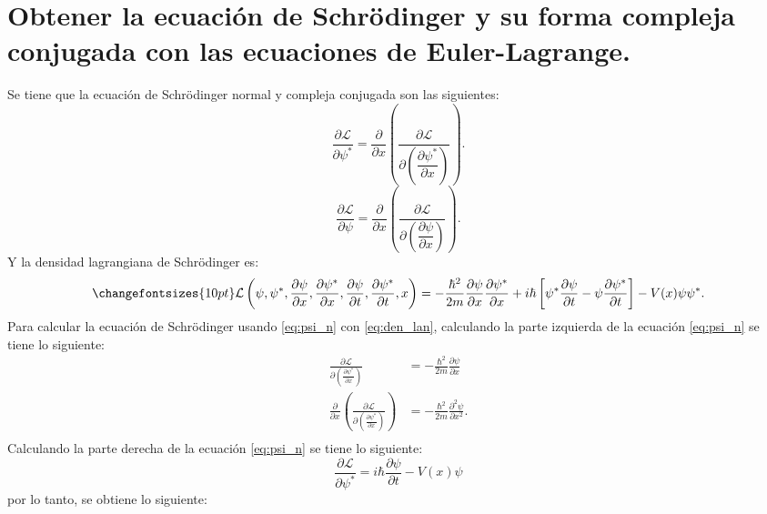 \section{Obtener la ecuación de Schr\"odinger y su forma compleja conjugada con las ecuaciones de Euler-Lagrange.}
Se tiene que la ecuación de Schr\"odinger normal y compleja conjugada son las siguientes:
\begin{equation}
    \frac{\partial \mathcal{L}}{\partial \psi^*}= \frac{\partial}{\partial x} \left(\frac{\partial \mathcal{L}}{\partial\left(\dfrac{\partial \psi^*}{\partial x}\right)} \right).
    \label{eq:psi_n}
\end{equation}
\begin{equation}
    \frac{\partial \mathcal{L}}{\partial \psi}= \frac{\partial}{\partial x} \left(\frac{\partial \mathcal{L}}{\partial\left(\dfrac{\partial \psi}{\partial x}\right)} \right).
    \label{eq:psi_con}
\end{equation}
Y la densidad lagrangiana de Schr\"odinger es:
\begin{equation}
    \changefontsizes{10pt}
    \mathcal{L}\left(\psi,\psi^*,\frac{\partial \psi}{\partial x},\frac{\partial \psi^*}{\partial x},\frac{\partial \psi}{\partial t},\frac{\partial \psi^*}{\partial t},x\right) = -\frac{\hbar^2}{2m} \frac{\partial \psi}{\partial x} \frac{\partial \psi^*}{\partial x}+i\hbar \left[ \psi^* \frac{\partial \psi}{\partial t} - \psi \frac{\partial \psi^*}{\partial t} \right] -V(x)\psi \psi^*.
    \label{eq:den_lan}
\end{equation}
Para calcular la ecuación de Schr\"odinger usando  \ref{eq:psi_n} con \ref{eq:den_lan}, calculando la parte izquierda de la ecuación \ref{eq:psi_n} se tiene lo siguiente:
\begin{align*}
    \frac{\partial \mathcal{L}}{\partial\left(\frac{\partial \psi^*}{\partial x}\right)}&= -\frac{\hbar^2}{2m} \frac{\partial \psi}{\partial x}\\
    \frac{\partial}{\partial x}\left( \frac{\partial \mathcal{L}}{\partial\left(\frac{\partial \psi^*}{\partial x}\right)}\right) &= -\frac{\hbar^2}{2m} \frac{\partial^2 \psi}{\partial x^2}.\\
\end{align*}
Calculando la parte derecha de la ecuación \ref{eq:psi_n} se tiene lo siguiente:
\begin{equation*}
    \frac{\partial \mathcal{L} } {\partial \psi^*}= i\hbar \frac{\partial \psi}{\partial t} - V(x)\psi
\end{equation*}
por lo tanto, se obtiene lo siguiente:
